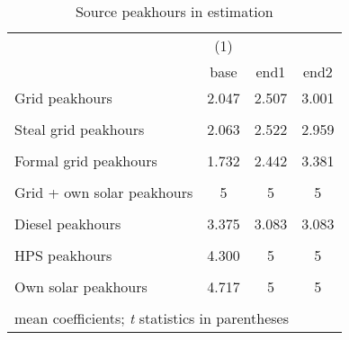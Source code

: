 \begin{table}[htbp]\centering
\caption{Source peakhours in estimation}
\begin{tabular}{l*{3}{c}}
\toprule
                &\multicolumn{1}{c}{(1)}&         &         \\
                &     base&     end1&     end2\\
\midrule
Grid peakhours  &    2.047&    2.507&    3.001\\
                &         &         &         \\
\addlinespace
Steal grid peakhours&    2.063&    2.522&    2.959\\
                &         &         &         \\
\addlinespace
Formal grid peakhours&    1.732&    2.442&    3.381\\
                &         &         &         \\
\addlinespace
Grid + own solar peakhours&        5&        5&        5\\
                &         &         &         \\
\addlinespace
Diesel peakhours&    3.375&    3.083&    3.083\\
                &         &         &         \\
\addlinespace
HPS peakhours   &    4.300&        5&        5\\
                &         &         &         \\
\addlinespace
Own solar peakhours&    4.717&        5&        5\\
                &         &         &         \\
\bottomrule
\multicolumn{4}{l}{\footnotesize mean coefficients; \textit{t} statistics in parentheses}\\
\end{tabular}
\end{table}
